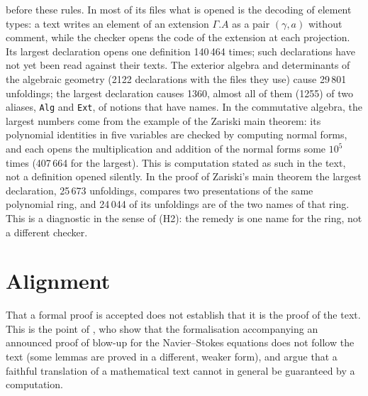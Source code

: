 \documentclass[11pt]{article}
\newcommand{\kw}[1]{\texttt{#1}}
\begin{document}
before these rules. In most of its files what is opened is the decoding
of element types: a text writes an element of an extension $\Gamma.A$
as a pair $(\gamma,a)$ without comment, while the checker opens the code
of the extension at each projection. Its largest declaration opens one definition
140\,464 times; such declarations have not yet been read against their
texts. The exterior algebra and determinants of the algebraic
geometry (2122 declarations with the files they use) cause 29\,801
unfoldings; the largest declaration causes 1360, almost all of them (1255)
of two aliases, \kw{Alg} and \kw{Ext}, of notions that have names.
In the commutative algebra, the largest numbers come from the example of
the Zariski main theorem: its polynomial identities in five variables
are checked by computing normal forms, and each opens the multiplication
and addition of the normal forms some $10^5$ times (407\,664 for the
largest). This is computation stated as such in the text, not a
definition opened silently. In the proof of Zariski's main theorem the
largest declaration, 25\,673 unfoldings, compares two presentations of
the same polynomial ring, and 24\,044 of its unfoldings are of the two
names of that ring. This is a diagnostic in the sense of (H2): the
remedy is one name for the ring, not a different checker.

\section{Alignment}\label{sec:align}

That a formal proof is accepted does not establish that it is the
proof of the text. This is the point of \cite{BCH}, who show that the
formalisation accompanying an announced proof of blow-up for the
Navier--Stokes equations does not follow the text (some lemmas are proved
in a different, weaker form), and argue that a faithful translation of a
mathematical text cannot in general be guaranteed by a computation.
\end{document}
